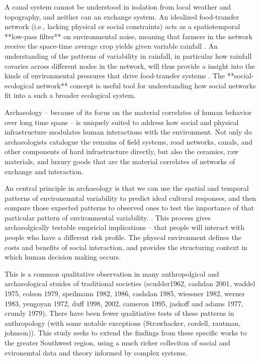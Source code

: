 \documentclass[fleqn,10pt]{wlscirep}
\begin{document}
A canal system cannot be understood in isolation from local weather and topography, and neither can an exchange system. An idealized food-transfer network (i.e., lacking physical or social constraints) acts as a spatiotemporal **low-pass filter** on environmental noise, meaning that farmers in the network receive the space-time average crop yields given variable rainfall \cite{Harpending1977}. An understanding of the patterns of variability in rainfall, in particular how rainfall covaries across different nodes in the network, will thus provide a insight into the kinds of environmental pressures that drive food-transfer systems \cite{Rautman1993a,Freeman2014}. The **social-ecological network** concept is useful tool for understanding how social networks fit into a such a broader ecological system.





Archaeology -- because of its focus on the material correlates of human behavior over long time spans -- is uniquely suited to address how social and physical infrastructure modulates human interactions with the environment. Not only do archaeologists catalogue the remains of field systems, road networks, canals, and other components of hard infrastructure directly, but also the ceramics, raw materials, and luxury goods that are the material correlates of networks of exchange and interaction.

An central principle in archaeology is that we can use the spatial and temporal patterns of environemntal variability to predict ideal cultural responses, and then compare those expected patterns to observed ones to test the importance of that particular pattern of environmental variability. \cite{halstead1989}. This process gives archaeolgically testable empricial implications -- that people will interact with people who have a different risk profile. The physcal environment defines the costs and benefits of social interaction, and provides the structuring context in which human decision making occurs.

This is a common qualitative observation in many anthropolgical and archaeological stuides of traditional societies (scudder1962, cashdan 2001, waddel 1975, colson 1979, speilmann 1982, 1986, cashdan 1985, wiessner 1982, werner 1983, yengoyan 1972, duff 1998, 2002, cameron 1995, jaskoff and adams 1977, crumly 1979).
There have been fewer qualitiative tests of these patterns in anthropology (with some notable exceptions (Strawhacker, cordell, rautman, johnson)). This study seeks to extend the findings from these specific works to the greater Southwest region, using a much richer colleciton of social and evironemtal data and theory informed by complex systems.
\end{document}
